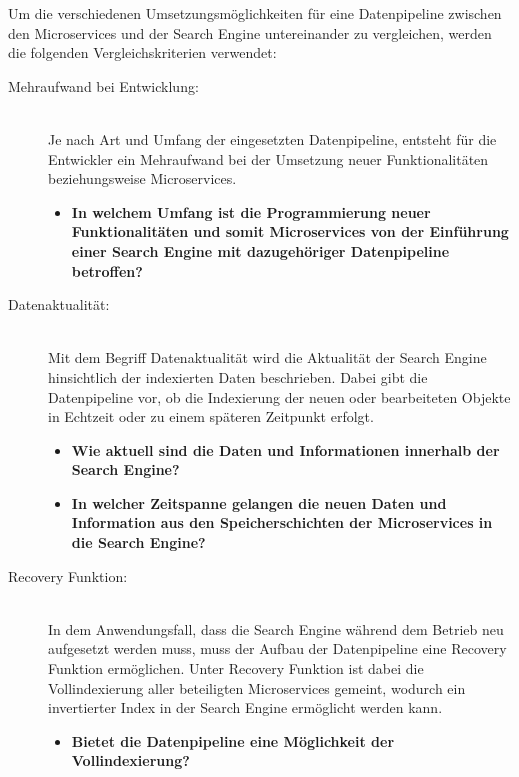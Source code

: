 Um die verschiedenen Umsetzungsmöglichkeiten für eine Datenpipeline zwischen den Microservices und der Search Engine untereinander zu vergleichen, werden die folgenden Vergleichskriterien verwendet:

\begin{description}
    \item[Mehraufwand bei Entwicklung:]\hfill \\
    Je nach Art und Umfang der eingesetzten Datenpipeline, entsteht für die Entwickler ein Mehraufwand bei der Umsetzung neuer Funktionalitäten beziehungsweise Microservices.
    
    \begin{itemize}
        \item \textbf{In welchem Umfang ist die Programmierung neuer Funktionalitäten und somit Microservices von der Einführung einer Search Engine mit dazugehöriger Datenpipeline betroffen?}
    \end{itemize}

    \item[Datenaktualität:]\hfill \\
    Mit dem Begriff \glqq Datenaktualität\grqq{} wird die Aktualität der Search Engine hinsichtlich der indexierten Daten beschrieben. Dabei gibt die Datenpipeline vor, ob die Indexierung der neuen oder bearbeiteten Objekte in \glqq Echtzeit\grqq{} oder zu einem späteren Zeitpunkt erfolgt.

    \begin{itemize}
        \item \textbf{Wie aktuell sind die Daten und Informationen innerhalb der Search Engine?}
        \item \textbf{In welcher Zeitspanne gelangen die neuen Daten und Information aus den Speicherschichten der Microservices in die Search Engine?}
    \end{itemize}
    
    \item[Recovery Funktion:]\hfill \\
    In dem Anwendungsfall, dass die Search Engine während dem Betrieb neu aufgesetzt werden muss, muss der Aufbau der Datenpipeline eine Recovery Funktion ermöglichen. Unter Recovery Funktion ist dabei die Vollindexierung aller beteiligten Microservices gemeint, wodurch ein invertierter Index in der Search Engine ermöglicht werden kann.
    
    \begin{itemize}
        \item \textbf{Bietet die Datenpipeline eine Möglichkeit der Vollindexierung?}
    \end{itemize}
    

\end{description}
